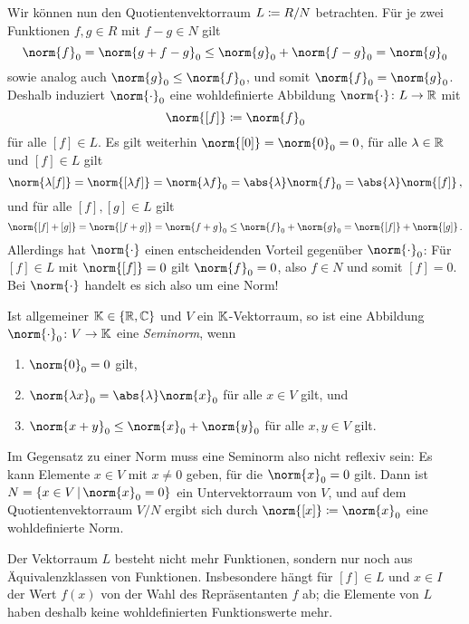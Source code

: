 Wir können nun den Quotientenvektorraum $L \coloneqq R/N$ betrachten.
Für je zwei Funktionen $f, g \in R$ mit $f - g \in N$ gilt
\[
        \norm{f}_0
  =     \norm{g + f-g}_0
  \leq  \norm{g}_0 + \norm{f-g}_0
  =     \norm{g}_0
\]
sowie analog auch $\norm{g}_0 \leq \norm{f}_0$, und somit $\norm{f}_0 = \norm{g}_0$.
Deshalb induziert $\norm{\cdot}_0$ eine wohldefinierte Abbildung $\norm{\cdot} \colon L \to \Real$ mit
\[
            \norm{[f]}
  \defined  \norm{f}_0
\]
für alle $[f] \in L$.
Es gilt weiterhin $\norm{[0]} = \norm{0}_0 = 0$, für alle $\lambda \in \mathbb{R}$ und $[f] \in L$ gilt
\[
    \norm{\lambda [f]}
  = \norm{[\lambda f]}
  = \norm{\lambda f}_0
  = \abs{\lambda} \norm{f}_0
  = \abs{\lambda} \norm{[f]} \,,
\]
und für alle $[f], [g] \in L$ gilt
\[
        \norm{[f] + [g]}
  =     \norm{[f + g]}
  =     \norm{f + g}_0
  \leq  \norm{f}_0 + \norm{g}_0
  =     \norm{[f]} + \norm{[g]} \,.
\]
Allerdings hat $\norm{\cdot}$ einen entscheidenden Vorteil gegenüber $\norm{\cdot}_0$:
Für $[f] \in L$ mit $\norm{[f]} = 0$ gilt $\norm{f}_0 = 0$, also $f \in N$ und somit $[f] = 0$.
Bei $\norm{\cdot}$ handelt es sich also um eine Norm!

\begin{remark}
  Ist allgemeiner $\mathbb{K} \in \{\mathbb{R}, \mathbb{C}\}$ und $V$ ein $\mathbb{K}$-Vektorraum, so ist eine Abbildung $\norm{\cdot}_0 \colon V \to \Korper$ eine \emph{Seminorm}, wenn
  \begin{enumerate}
    \item
      $\norm{0}_0 = 0$ gilt,
    \item
      $\norm{\lambda x}_0 = \abs{\lambda} \norm{x}_0$ für alle $x \in V$ gilt, und
    \item
      $\norm{x + y}_0 \leq \norm{x}_0 + \norm{y}_0$ für alle $x, y \in V$ gilt.
  \end{enumerate}
  Im Gegensatz zu einer Norm muss eine Seminorm also nicht reflexiv sein:
  Es kann Elemente $x \in V$ mit $x \neq 0$ geben, für die $\norm{x}_0 = 0$ gilt.
  Dann ist $N = \{x \in V \suchthat \norm{x}_0 = 0\}$ ein Untervektorraum von $V$, und auf dem Quotientenvektorraum $V/N$ ergibt sich durch $\norm{[x]} \defined \norm{x}_0$ eine wohldefinierte Norm.
\end{remark}

Der Vektorraum $L$ besteht nicht mehr Funktionen, sondern nur noch aus Äquivalenzklassen von Funktionen.
Insbesondere hängt für $[f] \in L$ und $x \in I$ der Wert $f(x)$ von der Wahl des Repräsentanten $f$ ab;
die Elemente von $L$ haben deshalb keine wohldefinierten Funktionswerte mehr.

